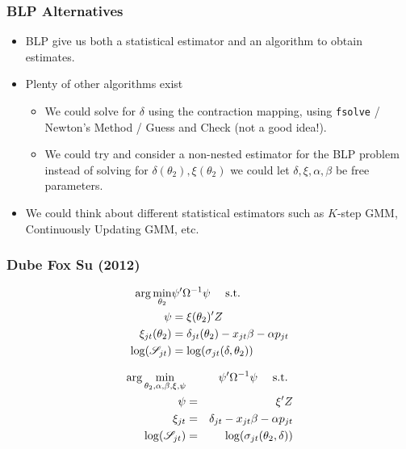 \documentclass[aspectratio=169,10pt]{beamer}
\begin{document}
 \begin{frame}
\frametitle{BLP Alternatives}
\begin{itemize}
 \item BLP give us both a statistical \alert{estimator} and an \alert{algorithm} to obtain estimates.
\item Plenty of other algorithms exist
\begin{itemize}
\item We could solve for $\delta$ using the contraction mapping, using \texttt{fsolve} / Newton's Method / Guess and Check (not a good idea!).
\item We could try and consider a non-nested estimator for the BLP problem instead of solving for $\delta(\theta_2),\xi(\theta_2)$ we could let $\delta,\xi,\alpha,\beta$ be free parameters.
 \end{itemize}
\item We could think about different statistical estimators such as $K$-step GMM, Continuously Updating GMM, etc.
 \end{itemize}
\end{frame}


 \begin{frame}\frametitle{Dube Fox Su (2012)}
\footnotesize
\begin{align}
\label{blpnfxp}
\nonumber \arg \min_{\theta_2} & \psi' \Omega^{-1} \psi \quad \mbox{ s.t. } \\
\nonumber \psi &= \xi(\theta_2)' Z\\
\xi_{jt}(\theta_2) &= \delta_{jt}(\theta_2) - x_{jt} \beta - \alpha p_{jt} \\
\nonumber \log(\mathscr{S}_{jt})  &= \log(\sigma_{jt}(\delta,\theta_2))
\end{align}

\begin{eqnarray}
\label{blpmpec}
\nonumber \arg \min_{\theta_2,\alpha,\beta, \xi,\psi} && \psi' \Omega^{-1}  \psi \quad \mbox{ s.t. } \\
 \psi &=& \xi' Z\\
\nonumber \xi_{jt} &=& \delta_{jt} - x_{jt} \beta - \alpha p_{jt} \\
\nonumber \log(\mathscr{S}_{jt})  &=& \log(\sigma_{jt}(\theta_2, \delta))
\end{eqnarray}
\end{frame}
\end{document}
